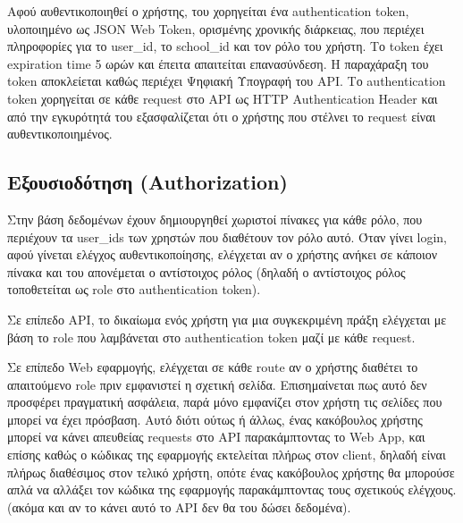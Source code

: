 \documentclass[a4paper]{article}
\begin{document}
\par Αφού αυθεντικοποιηθεί ο χρήστης, του χορηγείται ένα authentication token, υλοποιημένο ως JSON Web Token, ορισμένης χρονικής διάρκειας, που περιέχει πληροφορίες για το user\_id, το school\_id και τον ρόλο του χρήστη. Το token έχει expiration time 5 ωρών και έπειτα απαιτείται επανασύνδεση. Η παραχάραξη του token αποκλείεται καθώς περιέχει Ψηφιακή Υπογραφή του API. Το authentication token χορηγείται σε κάθε request στο API ως HTTP Authentication Header και από την εγκυρότητά του εξασφαλίζεται ότι ο χρήστης που στέλνει το request είναι αυθεντικοποιημένος.

\subsection{Εξουσιοδότηση (Authorization)}

\par Στην βάση δεδομένων έχουν δημιουργηθεί χωριστοί πίνακες για κάθε ρόλο, που περιέχουν τα user\_ids των χρηστών που διαθέτουν τον ρόλο αυτό. Όταν γίνει login, αφού γίνεται ελέγχος αυθεντικοποίησης, ελέγχεται αν ο χρήστης ανήκει σε κάποιον πίνακα και του απονέμεται ο αντίστοιχος ρόλος (δηλαδή ο αντίστοιχος ρόλος τοποθετείται ως role στο authentication token).

\par Σε επίπεδο API, το δικαίωμα ενός χρήστη για μια συγκεκριμένη πράξη ελέγχεται με βάση το role που λαμβάνεται στο authentication token μαζί με κάθε request.

\par Σε επίπεδο Web εφαρμογής, ελέγχεται σε κάθε route αν ο χρήστης διαθέτει το απαιτούμενο role πριν εμφανιστεί η σχετική σελίδα. Επισημαίνεται πως αυτό δεν προσφέρει πραγματική ασφάλεια, παρά μόνο εμφανίζει στον χρήστη τις σελίδες που μπορεί να έχει πρόσβαση. Αυτό διότι ούτως ή άλλως, ένας κακόβουλος χρήστης μπορεί να κάνει απευθείας requests στο API παρακάμπτοντας το Web App, και επίσης καθώς ο κώδικας της εφαρμογής εκτελείται πλήρως στον client, δηλαδή είναι πλήρως διαθέσιμος στον τελικό χρήστη, οπότε ένας κακόβουλος χρήστης θα μπορούσε απλά να αλλάξει τον κώδικα της εφαρμογής παρακάμπτοντας τους σχετικούς ελέγχους. (ακόμα και αν το κάνει αυτό το API δεν θα του δώσει δεδομένα).

\appendix
\end{document}
